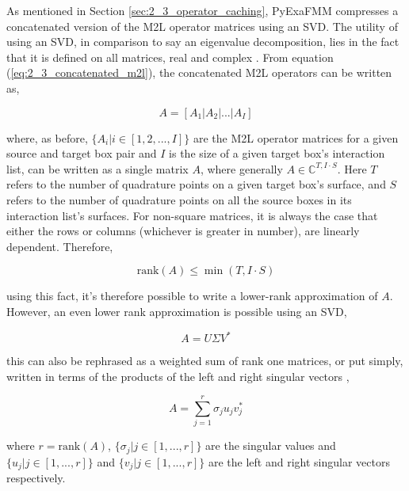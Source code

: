 As mentioned in Section \ref{sec:2_3_operator_caching}, \gls{PyExaFMM} compresses
a concatenated version of the \gls{M2L} operator matrices using an \gls{SVD}.
The utility of using an SVD, in comparison to say an eigenvalue decomposition, lies
in the fact that it is defined on all matrices, real and complex
\cite{Trefethen:1997:SIAM}. From equation (\ref{eq:2_3_concatenated_m2l}), the
concatenated M2L operators can be written as,

\begin{equation}
    A = \left [ A_1 | A_2 | ... | A_I \right]
    \label{eq:2_4_concatenated_m2l}
\end{equation}

where, as before, $\{A_i | i \in [1, 2, ..., I]\}$ are the M2L operator matrices
for a given source and target box pair and $I$ is the size of a given target box's
interaction list, can be written as a single matrix $A$, where generally
$A \in \mathbb{C}^{T, I \cdot S}$. Here $T$ refers to the number of quadrature
points on a given target box's surface, and $S$ refers to the number of quadrature
points on all the source boxes in its interaction list's surfaces. For non-square
matrices, it is always the case that either the rows or columns (whichever is
greater in number), are linearly dependent. Therefore,

\begin{equation}
    \text{rank}(A) \leq \min (T, I \cdot S)
\end{equation}

using this fact, it's therefore possible to write a lower-rank approximation of $A$.
However, an even lower rank approximation is possible using an SVD,

\begin{equation}
    A = U \Sigma V^*
\end{equation}

this can also be rephrased as a weighted sum of rank one matrices, or put simply,
written in terms of the products of the left and right singular vectors \cite{Trefethen:1997:SIAM},

\begin{equation}
    A = \sum_{j=1}^{r}\sigma_j u_j v_j^*
\end{equation}

where $r = \text{rank} (A)$, $\{\sigma_j | j \in [1, ..., r] \}$ are the singular
values and $\{u_j | j \in [1, ..., r] \} $ and $\{v_j | j \in [1, ..., r] \}$
are the left and right singular vectors respectively.

